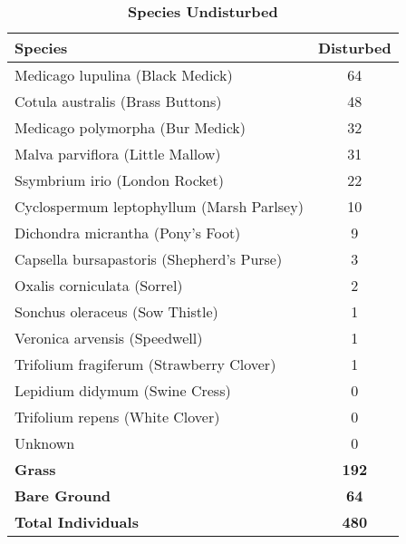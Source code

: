 \documentclass{article}
\begin{document}
\begin{table}[h!]
  \begin{center}
    \caption{\textbf{Species Undisturbed}}
    \begin{tabular}{|l|c|}\hline
      \textbf{Species} & \textbf{Disturbed}\\ \hline
      Medicago lupulina (Black Medick) & 64 \\\hline
      Cotula australis (Brass Buttons) & 48 \\\hline
      Medicago polymorpha (Bur Medick) & 32 \\\hline
      Malva parviflora (Little Mallow) & 31 \\\hline
      Ssymbrium irio (London Rocket) & 22 \\\hline
      Cyclospermum leptophyllum (Marsh Parlsey) & 10 \\\hline
      Dichondra micrantha (Pony's Foot) & 9 \\\hline
      Capsella bursapastoris (Shepherd's Purse) & 3 \\\hline
      Oxalis corniculata (Sorrel) & 2 \\\hline
      Sonchus oleraceus (Sow Thistle) & 1 \\\hline
      Veronica arvensis (Speedwell) & 1 \\\hline
      Trifolium fragiferum (Strawberry Clover) & 1 \\\hline
      Lepidium didymum (Swine Cress) & 0 \\\hline
      Trifolium repens (White Clover) & 0 \\\hline
      Unknown & 0 \\\hline
      \textbf{Grass} & \textbf{192} \\\hline
      \textbf{Bare Ground} & \textbf{64} \\\hline
      \textbf{Total Individuals} & \textbf{480} \\\hline
    \end{tabular}
  \end{center}
\end{table}
\end{document}
